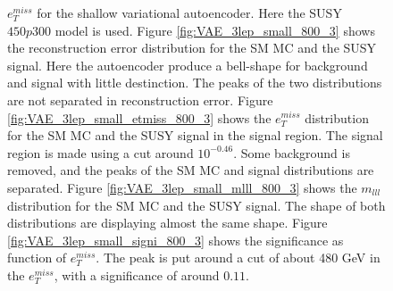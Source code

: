 \begin{figure}[H]
{    $e_T^{miss}$ for the shallow variational autoencoder. Here the SUSY $450p300$ model is used. 
    Figure \ref{fig:VAE_3lep_small_800_3} shows the reconstruction error 
    distribution for the SM MC and the SUSY signal. Here the autoencoder produce a bell-shape for background and 
    signal with little destinction. The peaks of the two distributions are not separated in reconstruction error. Figure \ref{fig:VAE_3lep_small_etmiss_800_3} 
    shows the $e_T^{miss}$ distribution for the SM MC and the SUSY signal in the signal region. 
    The signal region is made using a cut around $10^{-0.46}$. Some background is removed, and the peaks of the SM MC and signal 
    distributions are separated. Figure \ref{fig:VAE_3lep_small_mlll_800_3} shows the $m_{lll}$ distribution for the SM MC and the SUSY signal. 
    The shape of both distributions are displaying almost the same shape. Figure \ref{fig:VAE_3lep_small_signi_800_3} shows the significance as 
    function of $e_T^{miss}$. The peak is put around a cut of about 480 GeV in the $e_T^{miss}$, with a significance of around $0.11$.}
    \label{fig:VAE_3lep_small_rec_sig_signi_800_3}
\end{figure}

